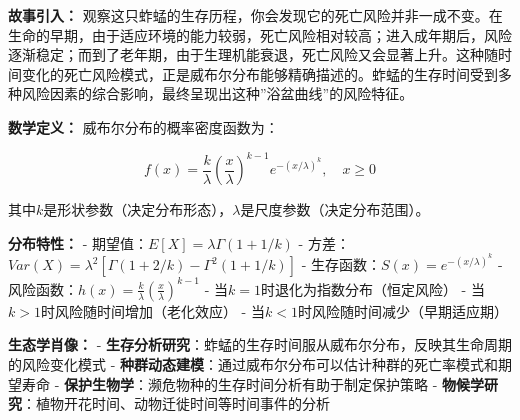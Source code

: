 \documentclass[
]{book}
\begin{document}
\textbf{故事引入：} 观察这只蚱蜢的生存历程，你会发现它的死亡风险并非一成不变。在生命的早期，由于适应环境的能力较弱，死亡风险相对较高；进入成年期后，风险逐渐稳定；而到了老年期，由于生理机能衰退，死亡风险又会显著上升。这种随时间变化的死亡风险模式，正是威布尔分布能够精确描述的。蚱蜢的生存时间受到多种风险因素的综合影响，最终呈现出这种''浴盆曲线''的风险特征。

\textbf{数学定义：} 威布尔分布的概率密度函数为：

\[f(x) = \frac{k}{\lambda} \left(\frac{x}{\lambda}\right)^{k-1} e^{-(x/\lambda)^k}, \quad x \geq 0\]

其中\(k\)是形状参数（决定分布形态），\(\lambda\)是尺度参数（决定分布范围）。

\textbf{分布特性：}
- 期望值：\(E[X] = \lambda \Gamma(1 + 1/k)\)
- 方差：\(Var(X) = \lambda^2 [\Gamma(1 + 2/k) - \Gamma^2(1 + 1/k)]\)
- 生存函数：\(S(x) = e^{-(x/\lambda)^k}\)
- 风险函数：\(h(x) = \frac{k}{\lambda} \left(\frac{x}{\lambda}\right)^{k-1}\)
- 当\(k=1\)时退化为指数分布（恒定风险）
- 当\(k>1\)时风险随时间增加（老化效应）
- 当\(k<1\)时风险随时间减少（早期适应期）

\textbf{生态学肖像：}
- \textbf{生存分析研究}：蚱蜢的生存时间服从威布尔分布，反映其生命周期的风险变化模式
- \textbf{种群动态建模}：通过威布尔分布可以估计种群的死亡率模式和期望寿命
- \textbf{保护生物学}：濒危物种的生存时间分析有助于制定保护策略
- \textbf{物候学研究}：植物开花时间、动物迁徙时间等时间事件的分析
\end{document}
